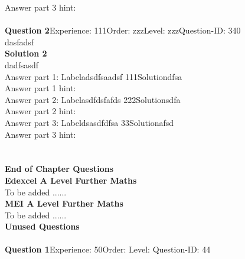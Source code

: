\documentclass{article}
\begin{document}
Answer part 3 hint: \hspace{15pt}\\
\\[4pt]
\noindent\textbf{Question 2}\hspace{20pt}Experience: 111\hspace{20pt}Order: zzz\hspace{20pt}Level: zzz\hspace{20pt}Question-ID: 340\\[2pt]
dasfadsf\\[4pt]
\noindent\textbf{Solution 2}\\[2pt]
dadfsasdf\\[4pt]
Answer part 1: \hspace{10pt}Label\hspace{10pt}adsdfsaadsf  111\hspace{10pt}Solution\hspace{10pt}dfsa\\
Answer part 1 hint: \hspace{15pt}\\
Answer part 2: \hspace{10pt}Label\hspace{10pt}asdfdsfafds  222\hspace{10pt}Solution\hspace{10pt}sdfa\\
Answer part 2 hint: \hspace{15pt}\\
Answer part 3: \hspace{10pt}Label\hspace{10pt}dsasdfdfsa 33\hspace{10pt}Solution\hspace{10pt}afsd\\
Answer part 3 hint: \hspace{15pt}\\
\\[4pt]
\\[2pt]
\noindent\large{\textbf{End of Chapter Questions}}\\[15pt]
\noindent\Huge{\textbf{Edexcel A Level Further Maths}}\\[5pt]
\noindent\large{To be added ......}\\[20pt]
\noindent\Huge{\textbf{MEI A Level Further Maths}}\\[5pt]
\noindent\large{To be added ......}\\[20pt]
\noindent\Huge{\textbf{Unused Questions}}\\[10pt]
\noindent\large{}\\\noindent\textbf{Question 1}\hspace{20pt}Experience: 50\hspace{20pt}Order: \hspace{20pt}Level: \hspace{20pt}Question-ID: 44\\[2pt]
\end{document}
